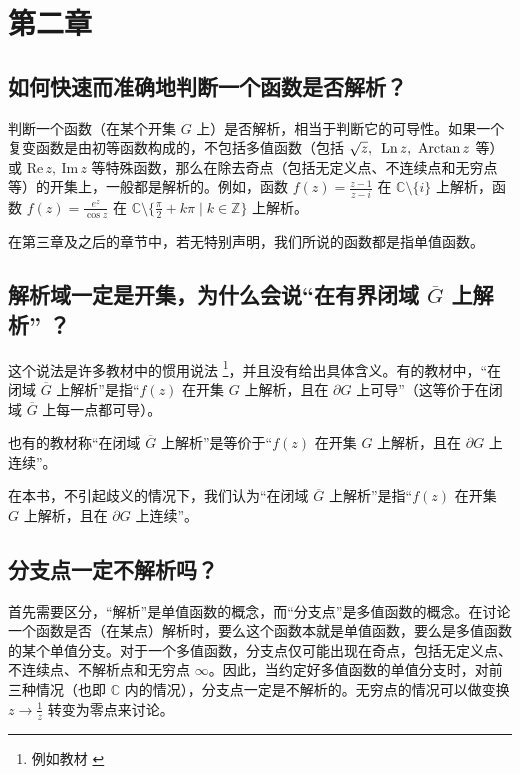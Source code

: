 \documentclass[UTF8]{report}
\def\Im{\mathrm{Im\,}}
\def\Re{\mathrm{Re\,}}
\def\Ln{\mathrm{\,Ln\,}}
\def\Z{\mathbb{Z}}
\def\C{\mathbb{C}}
\theoremstyle{MyLineTheoremStyle} %
\theoremstyle{MyBlockTheoremStyle} %
\theoremstyle{MySubsubsectionStyle} %
\begin{document}
\section{第二章}


\subsection{如何快速而准确地判断一个函数是否解析？}

判断一个函数（在某个开集 $G$ 上）是否解析，相当于判断它的可导性。如果一个复变函数是由初等函数构成的，不包括多值函数（包括 $\sqrt{z},\ \Ln z,\ \text{Arctan\,} z$ 等）或 $\Re z,\ \Im z$ 等特殊函数，那么在除去奇点（包括无定义点、不连续点和无穷点等）的开集上，一般都是解析的。例如，函数 $f(z) = \frac{z - 1}{z - i}$ 在 $\C \setminus \{i\}$ 上解析，函数 $f(z) = \frac{e^z}{\cos z}$ 在 $\C \setminus \{\frac{\pi}{2} + k\pi \mid k \in \Z \}$ 上解析。

在第三章及之后的章节中，若无特别声明，我们所说的函数都是指单值函数。

\subsection{解析域一定是开集，为什么会说“在有界闭域 $\overline{G} $ 上解析” ？}\label{在闭域上解析}

这个说法是许多教材中的惯用说法 \footnote{例如教材 \cite{数学物理方法}}，并且没有给出具体含义。有的教材中，“在闭域 $\overline{G}$ 上解析”是指“$f(z)$ 在开集 $G$ 上解析，且在 $\partial G$ 上可导”（这等价于在闭域 $\overline{G}$ 上每一点都可导）。

也有的教材称“在闭域 $\overline{G}$ 上解析”是等价于“$f(z)$ 在开集 $G$ 上解析，且在 $\partial G$ 上连续”。

在本书，不引起歧义的情况下，我们认为“在闭域 $\overline{G} $ 上解析”是指“$f(z)$ 在开集 $G$ 上解析，且在 $\partial G$ 上连续”。

\subsection{分支点一定不解析吗？}
首先需要区分，“解析”是单值函数的概念，而“分支点”是多值函数的概念。在讨论一个函数是否（在某点）解析时，要么这个函数本就是单值函数，要么是多值函数的某个单值分支。对于一个多值函数，分支点仅可能出现在奇点，包括无定义点、不连续点、不解析点和无穷点 $\infty$。因此，当约定好多值函数的单值分支时，对前三种情况（也即 $\C$ 内的情况），分支点一定是不解析的。无穷点的情况可以做变换 $z \to \frac{1}{z}$ 转变为零点来讨论。
\end{document}
